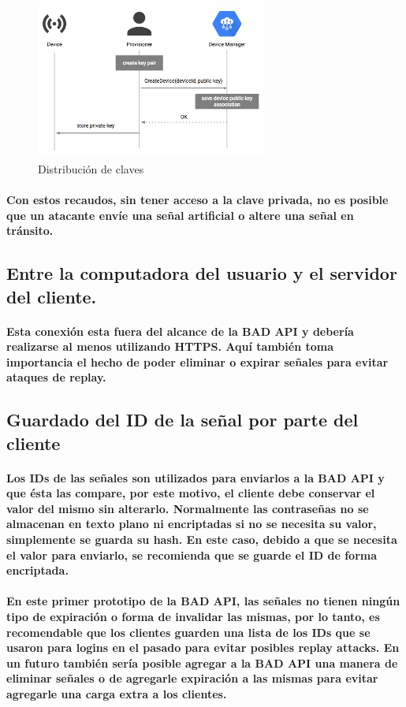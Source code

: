 \documentclass{article}
\begin{document}
\begin{figure}[ht]
    \centering
    \includegraphics[width=3in]{key-generation.jpeg}%
    \caption{Distribución de claves}
    \label{fig:keypairgeneration}
\end{figure}

\paragraph{
Con estos recaudos, sin tener acceso a la clave privada, no es posible que un atacante envíe una señal artificial o altere una señal en tránsito.
}

\subsection{Entre la computadora del usuario y el servidor del cliente.}
\paragraph{
Esta conexión esta fuera del alcance de la BAD API y debería realizarse al menos utilizando HTTPS. Aquí también toma importancia el hecho de poder eliminar o expirar señales para evitar ataques de replay.
}
\subsection{Guardado del ID de la señal por parte del cliente}
\paragraph{
Los IDs de las señales son utilizados para enviarlos a la BAD API y que ésta las compare, por este motivo, el cliente debe conservar el valor del mismo sin alterarlo. Normalmente las contraseñas no se almacenan en texto plano ni encriptadas si no se necesita su valor, simplemente se guarda su hash. En este caso, debido a que se necesita el valor para enviarlo, se recomienda que se guarde el ID de forma encriptada.
}
\paragraph{
En este primer prototipo de la BAD API, las señales no tienen ningún tipo de expiración o forma de invalidar las mismas, por lo tanto, es recomendable que los clientes guarden una lista de los IDs que se usaron para logins en el pasado para evitar posibles replay attacks. En un futuro también sería posible agregar a la BAD API una manera de eliminar señales o de agregarle expiración a las mismas para evitar agregarle una carga extra a los clientes.
}
\end{document}

